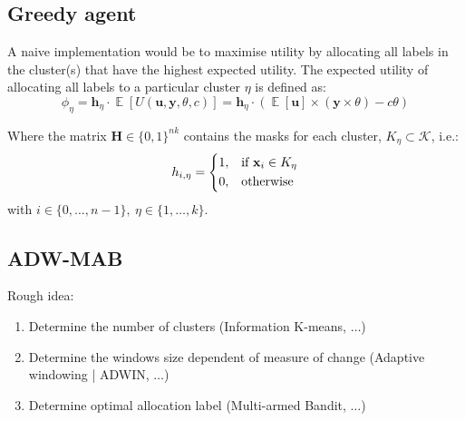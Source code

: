 \subsection*{Greedy agent}
A naive implementation would be to maximise utility by allocating all labels in the cluster(s) that have the highest expected utility.
The expected utility of allocating all labels to a particular cluster $\eta$ is defined as:
\begin{equation}
\phi_{\eta} = \textbf{h}_{\eta} \cdot \mathop{\mathbb{E}}[U(\textbf{u}, \mathbf{y}, \theta, c)] = \textbf{h}_{\eta} \cdot (\mathop{\mathbb{E}}[\textbf{u}] \times (\textbf{y} \times \theta) - c\theta)
\end{equation}

Where the matrix $\textbf{H} \in {\{0,1\}}^{nk}$ contains the masks for each cluster, $K_\eta \subset \mathcal{K}$, i.e.:
\begin{equation}
h_{i,\eta}=
\begin{dcases}
1,& \text{if } \textbf{x}_{i} \in K_\eta\\
0, & \text{otherwise}
\end{dcases}
\end{equation}
with $i \in \{0,\ldots,n-1\},~\eta \in \{1, \ldots, k\}$.\\

\subsection*{ADW-MAB}
Rough idea:
\begin{enumerate}
  \item Determine the number of clusters (Information K-means, $\ldots$)
  \item Determine the windows size dependent of measure of change (Adaptive windowing | ADWIN, $\ldots$)
  \item Determine optimal allocation label (Multi-armed Bandit, $\ldots$)
\end{enumerate}

